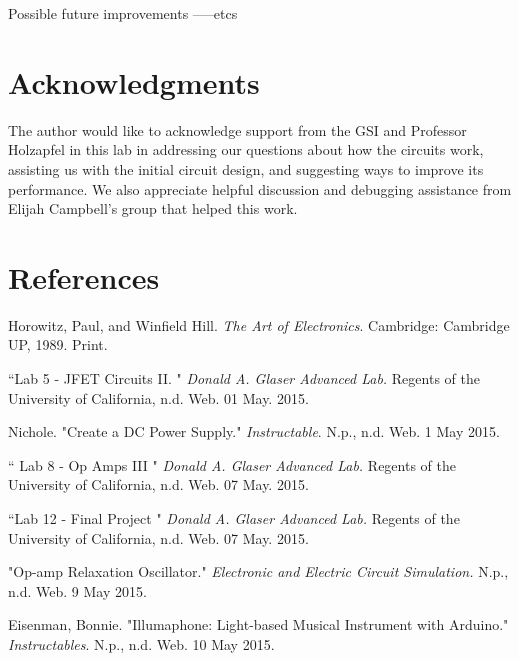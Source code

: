 \documentclass[twocolumn]{article}
\begin{document}
Possible future improvements -----etcs
\section*{Acknowledgments}
\begin{footnotesize}
The author would like to acknowledge support from the GSI and Professor Holzapfel in this lab in addressing our questions about how the circuits work, assisting us with the initial circuit design, and suggesting ways to improve its performance.  We also appreciate helpful discussion and debugging assistance from Elijah Campbell's group that helped this work.
\end{footnotesize}
  \section*{References}
 \begin{footnotesize}
\begin{enumerate}[label={[\arabic*]}]
\setlength\itemsep{0.001em}
 \item Horowitz, Paul, and Winfield Hill. \textit{The Art of Electronics}. Cambridge: Cambridge UP, 1989. Print.
 \item ``Lab 5 - JFET Circuits II. " \textit{Donald A. Glaser Advanced Lab.} Regents of the University of California, n.d. Web. 01 May. 2015.
 \item Nichole. "Create a DC Power Supply." \textit{Instructable}. N.p., n.d. Web. 1 May 2015.
  \item `` Lab 8 - Op Amps III " \textit{Donald A. Glaser Advanced Lab.} Regents of the University of California, n.d. Web. 07 May. 2015.
  \item ``Lab 12 - Final Project " \textit{Donald A. Glaser Advanced Lab.} Regents of the University of California, n.d. Web. 07 May. 2015.
 \item "Op-amp Relaxation Oscillator." \textit{Electronic and Electric Circuit Simulation.} N.p., n.d. Web. 9 May 2015.
 \item Eisenman, Bonnie. "Illumaphone: Light-based Musical Instrument with Arduino." \textit{Instructables}. N.p., n.d. Web. 10 May 2015.
\end{enumerate}
  \end{footnotesize}
\end{document}
